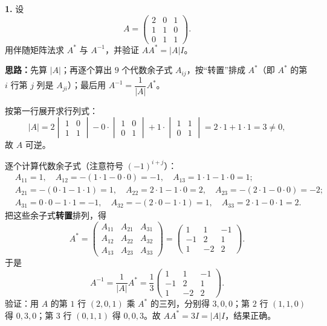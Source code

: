 \textbf{1.} 设
\[
A=\begin{pmatrix}
2&0&1\\
1&1&0\\
0&1&1
\end{pmatrix}.
\]
用伴随矩阵法求 \(A^*\) 与 \(A^{-1}\)，并验证 \(AA^*=|A|I\)。

\ifshowsolutions%
\textbf{思路：}先算 \(|A|\)；再逐个算出 \(9\) 个代数余子式 \(A_{ij}\)，按“转置”排成 \(A^*\)（即 \(A^*\) 的第 \(i\) 行第 \(j\) 列是 \(A_{ji}\)）；最后用 \(A^{-1}=\dfrac{1}{|A|}A^*\)。

按第一行展开求行列式：
\[
|A|=2\begin{vmatrix}1&0\\1&1\end{vmatrix}
-0\cdot\begin{vmatrix}1&0\\0&1\end{vmatrix}
+1\cdot\begin{vmatrix}1&1\\0&1\end{vmatrix}
=2\cdot 1+1\cdot 1=3\neq 0,
\]
故 \(A\) 可逆。

逐个计算代数余子式（注意符号 \((-1)^{i+j}\)）：
\[
\begin{aligned}
&A_{11}=1,\quad A_{12}=-(1\cdot1-0\cdot0)=-1,\quad A_{13}=1\cdot1-1\cdot0=1;\\
&A_{21}=-(0\cdot1-1\cdot1)=1,\quad A_{22}=2\cdot1-1\cdot0=2,\quad A_{23}=-(2\cdot1-0\cdot0)=-2;\\
&A_{31}=0\cdot0-1\cdot1=-1,\quad A_{32}=-(2\cdot0-1\cdot1)=1,\quad A_{33}=2\cdot1-0\cdot1=2.
\end{aligned}
\]
把这些余子式\textbf{转置}排列，得
\[
A^*=\begin{pmatrix}
A_{11}&A_{21}&A_{31}\\
A_{12}&A_{22}&A_{32}\\
A_{13}&A_{23}&A_{33}
\end{pmatrix}
=\begin{pmatrix}
1&1&-1\\
-1&2&1\\
1&-2&2
\end{pmatrix}.
\]
于是
\[
A^{-1}=\frac{1}{|A|}A^*=\frac{1}{3}\begin{pmatrix}
1&1&-1\\
-1&2&1\\
1&-2&2
\end{pmatrix}.
\]
验证：用 \(A\) 的第 \(1\) 行 \((2,0,1)\) 乘 \(A^*\) 的三列，分别得 \(3,0,0\)；第 \(2\) 行 \((1,1,0)\) 得 \(0,3,0\)；第 \(3\) 行 \((0,1,1)\) 得 \(0,0,3\)。故 \(AA^*=3I=|A|I\)，结果正确。


